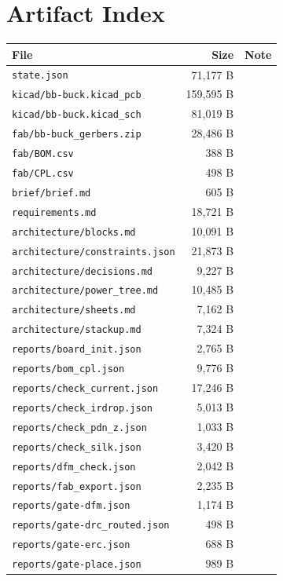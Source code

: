 \documentclass[11pt,a4paper]{article}
\begin{document}
\section{Artifact Index}
{\small
\begin{longtable}{p{9cm}rp{4cm}}
\toprule
\textbf{File} & \textbf{Size} & \textbf{Note} \\
\midrule
\endhead
\texttt{state.json} & 71,177 B &  \\
\texttt{kicad/bb-buck.kicad\_pcb} & 159,595 B &  \\
\texttt{kicad/bb-buck.kicad\_sch} & 81,019 B &  \\
\texttt{fab/bb-buck\_gerbers.zip} & 28,486 B &  \\
\texttt{fab/BOM.csv} & 388 B &  \\
\texttt{fab/CPL.csv} & 498 B &  \\
\texttt{brief/brief.md} & 605 B &  \\
\texttt{requirements.md} & 18,721 B &  \\
\texttt{architecture/blocks.md} & 10,091 B &  \\
\texttt{architecture/constraints.json} & 21,873 B &  \\
\texttt{architecture/decisions.md} & 9,227 B &  \\
\texttt{architecture/power\_tree.md} & 10,485 B &  \\
\texttt{architecture/sheets.md} & 7,162 B &  \\
\texttt{architecture/stackup.md} & 7,324 B &  \\
\texttt{reports/board\_init.json} & 2,765 B &  \\
\texttt{reports/bom\_cpl.json} & 9,776 B &  \\
\texttt{reports/check\_current.json} & 17,246 B &  \\
\texttt{reports/check\_irdrop.json} & 5,013 B &  \\
\texttt{reports/check\_pdn\_z.json} & 1,033 B &  \\
\texttt{reports/check\_silk.json} & 3,420 B &  \\
\texttt{reports/dfm\_check.json} & 2,042 B &  \\
\texttt{reports/fab\_export.json} & 2,235 B &  \\
\texttt{reports/gate-dfm.json} & 1,174 B &  \\
\texttt{reports/gate-drc\_routed.json} & 498 B &  \\
\texttt{reports/gate-erc.json} & 688 B &  \\
\texttt{reports/gate-place.json} & 989 B &  \\

\end{longtable}}
\end{document}
